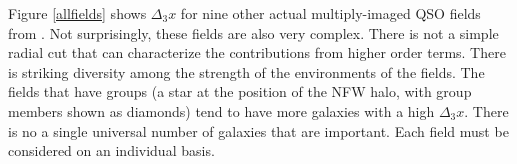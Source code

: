 Figure \ref{allfields} shows $\Delta_3 x$ for nine other actual multiply-imaged QSO fields from \citet{Wong11}. Not surprisingly, these fields are also very complex. There is not a simple radial cut that can characterize the contributions from higher order terms. There is striking diversity among the strength of the environments of the fields. The fields that have groups (a star at the position of the NFW halo, with group members shown as diamonds) tend to have more galaxies with a high $\Delta_3 x$. There is no a single universal number of galaxies that are important. Each field must be considered on an individual basis.